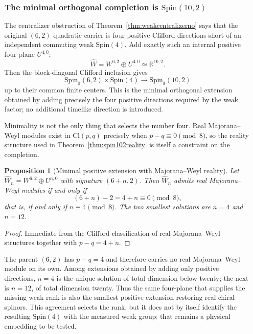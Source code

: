 \documentclass[11pt]{article}
\newtheorem{proposition}[theorem]{Proposition}
\theoremstyle{definition}\newtheorem{definition}[theorem]{Definition}
\theoremstyle{remark}\newtheorem{remark}[theorem]{Remark}\newtheorem{conjecture}[theorem]{Conjecture}
\begin{document}
\subsubsection{The minimal orthogonal completion is \texorpdfstring{$\mathrm{Spin}(10,2)$}{Spin(10,2)}}\label{subsubsec:spin102}
The centralizer obstruction of Theorem~\ref{thm:weakcentralizerno} says that the original $(6,2)$ quadratic carrier is four positive Clifford directions short of an independent commuting weak $\mathrm{Spin}(4)$. Add exactly such an internal positive four-plane $U^{4,0}$:
\begin{equation}\label{eq:102split}
 \boxed{\widehat W=W^{6,2}\oplus U^{4,0}\simeq\mathbb R^{10,2}.}
\end{equation}
Then the block-diagonal Clifford inclusion gives
\begin{equation}
 \mathrm{Spin}_0(6,2)\times\mathrm{Spin}(4)
 \longrightarrow
 \mathrm{Spin}_0(10,2)
\end{equation}
up to their common finite centers. This is the minimal orthogonal extension obtained by adding precisely the four positive directions required by the weak factor; no additional timelike direction is introduced.

Minimality is not the only thing that selects the number four. Real Majorana--Weyl modules exist in $\mathrm{Cl}(p,q)$ precisely when $p-q\equiv0\pmod 8$, so the reality structure used in Theorem~\ref{thm:spin102reality} is itself a constraint on the completion.

\begin{proposition}[Minimal positive extension with Majorana--Weyl reality]\label{prop:n4unique}
Let $\widehat W_n=W^{6,2}\oplus U^{n,0}$ with signature $(6+n,2)$. Then $\widehat W_n$ admits real Majorana--Weyl modules if and only if
\begin{equation}\label{eq:n4mod8}
 (6+n)-2=4+n\equiv0\pmod 8,
\end{equation}
that is, if and only if $n\equiv4\pmod 8$. The two smallest solutions are $n=4$ and $n=12$.
\end{proposition}
\begin{proof}
Immediate from the Clifford classification of real Majorana--Weyl structures together with $p-q=4+n$.
\end{proof}

The parent $(6,2)$ has $p-q=4$ and therefore carries no real Majorana--Weyl module on its own. Among extensions obtained by adding only positive directions, $n=4$ is the unique solution of total dimension below twenty; the next is $n=12$, of total dimension twenty. Thus the same four-plane that supplies the missing weak rank is also the smallest positive extension restoring real chiral spinors. This agreement selects the rank, but it does not by itself identify the resulting $\mathrm{Spin}(4)$ with the measured weak group; that remains a physical embedding to be tested.
\end{document}
